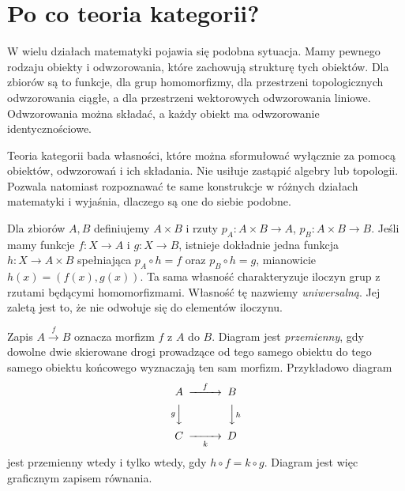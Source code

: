 \section{Po co teoria kategorii?}\label{sec:motywacja}

W wielu działach matematyki pojawia się podobna sytuacja. Mamy pewnego rodzaju obiekty i odwzorowania, które zachowują strukturę tych obiektów. Dla zbiorów są to funkcje, dla grup homomorfizmy, dla przestrzeni topologicznych odwzorowania ciągłe, a dla przestrzeni wektorowych odwzorowania liniowe. Odwzorowania można składać, a każdy obiekt ma odwzorowanie identycznościowe.

Teoria kategorii bada własności, które można sformułować wyłącznie za pomocą obiektów, odwzorowań i ich składania. Nie usiłuje zastąpić algebry lub topologii. Pozwala natomiast rozpoznawać te same konstrukcje w różnych działach matematyki i wyjaśnia, dlaczego są one do siebie podobne.

\begin{przyklad}
Dla zbiorów $A,B$ definiujemy $A\times B$ i rzuty $p_A:A\times B\to A$, $p_B:A\times B\to B$. Jeśli mamy funkcje $f:X\to A$ i $g:X\to B$, istnieje dokładnie jedna funkcja $h:X\to A\times B$ spełniająca $p_A\circ h=f$ oraz $p_B\circ h=g$, mianowicie $h(x)=(f(x),g(x))$. Ta sama własność charakteryzuje iloczyn grup z rzutami będącymi homomorfizmami. Własność tę nazwiemy \emph{uniwersalną}. Jej zaletą jest to, że nie odwołuje się do elementów iloczynu.
\end{przyklad}

\begin{uwaga}
Zapis $A\xrightarrow{f}B$ oznacza morfizm $f$ z $A$ do $B$. Diagram jest \emph{przemienny}, gdy dowolne dwie skierowane drogi prowadzące od tego samego obiektu do tego samego obiektu końcowego wyznaczają ten sam morfizm. Przykładowo diagram
\[
\begin{CD}
A @>f>> B\\
@VgVV @VVhV\\
C @>>k> D
\end{CD}
\]
jest przemienny wtedy i tylko wtedy, gdy $h\circ f=k\circ g$. Diagram jest więc graficznym zapisem równania.
\end{uwaga}

